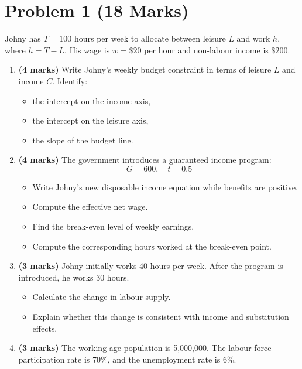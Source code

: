 \documentclass[12pt]{article}
\begin{document}
\section*{Problem 1 (18 Marks)}

Johny has \(T=100\) hours per week to allocate between leisure \(L\) and work \(h\), where \(h=T-L\). His wage is \(w=\$20\) per hour and non-labour income is \(\$200\).

\begin{enumerate}[label=(\alph*)]

\item \textbf{(4 marks)}  
Write Johny's weekly budget constraint in terms of leisure \(L\) and income \(C\).  
Identify:
\begin{itemize}
    \item the intercept on the income axis,
    \item the intercept on the leisure axis,
    \item the slope of the budget line.
\end{itemize}

\item \textbf{(4 marks)}  
The government introduces a guaranteed income program:
\[
G = 600,\quad t = 0.5
\]

\begin{itemize}
    \item Write Johny’s new disposable income equation while benefits are positive.
    \item Compute the effective net wage.
    \item Find the break-even level of weekly earnings.
    \item Compute the corresponding hours worked at the break-even point.
\end{itemize}

\item \textbf{(3 marks)}  
Johny initially works 40 hours per week. After the program is introduced, he works 30 hours.

\begin{itemize}
    \item Calculate the change in labour supply.
    \item Explain whether this change is consistent with income and substitution effects.
\end{itemize}

\item \textbf{(3 marks)}  
The working-age population is 5,000,000. The labour force participation rate is 70\%, and the unemployment rate is 6\%.


\end{enumerate}
\end{document}
